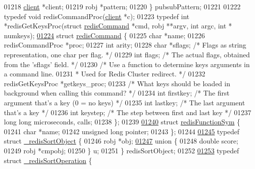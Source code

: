 \begin{DoxyCode}
{{{{{{{01218     \hyperlink{structclient}{client} *client;
01219     robj *pattern;
01220 \} pubsubPattern;
01221 
01222 \textcolor{keyword}{typedef} \textcolor{keywordtype}{void} redisCommandProc(\hyperlink{structclient}{client} *c);
01223 \textcolor{keyword}{typedef} \textcolor{keywordtype}{int} *redisGetKeysProc(\textcolor{keyword}{struct} \hyperlink{structredisCommand}{redisCommand} *cmd, robj **argv, \textcolor{keywordtype}{int} argc, \textcolor{keywordtype}{int} *
      numkeys);
\hyperlink{structredisCommand}{01224} \textcolor{keyword}{struct} \hyperlink{structredisCommand}{redisCommand} \{
01225     \textcolor{keywordtype}{char} *name;
01226     redisCommandProc *proc;
01227     \textcolor{keywordtype}{int} arity;
01228     \textcolor{keywordtype}{char} *sflags; \textcolor{comment}{/* Flags as string representation, one char per flag. */}
01229     \textcolor{keywordtype}{int} flags;    \textcolor{comment}{/* The actual flags, obtained from the 'sflags' field. */}
01230     \textcolor{comment}{/* Use a function to determine keys arguments in a command line.}
01231 \textcolor{comment}{     * Used for Redis Cluster redirect. */}
01232     redisGetKeysProc *getkeys\_proc;
01233     \textcolor{comment}{/* What keys should be loaded in background when calling this command? */}
01234     \textcolor{keywordtype}{int} firstkey; \textcolor{comment}{/* The first argument that's a key (0 = no keys) */}
01235     \textcolor{keywordtype}{int} lastkey;  \textcolor{comment}{/* The last argument that's a key */}
01236     \textcolor{keywordtype}{int} keystep;  \textcolor{comment}{/* The step between first and last key */}
01237     \textcolor{keywordtype}{long} \textcolor{keywordtype}{long} microseconds, calls;
01238 \};
01239 
\hyperlink{structredisFunctionSym}{01240} \textcolor{keyword}{struct} \hyperlink{structredisFunctionSym}{redisFunctionSym} \{
01241     \textcolor{keywordtype}{char} *name;
01242     \textcolor{keywordtype}{unsigned} \textcolor{keywordtype}{long} pointer;
01243 \};
01244 
\hyperlink{struct__redisSortObject}{01245} \textcolor{keyword}{typedef} \textcolor{keyword}{struct} \hyperlink{struct__redisSortObject}{\_redisSortObject} \{
01246     robj *obj;
\hyperlink{union__redisSortObject_8u}{01247}     \textcolor{keyword}{union} \{
01248         \textcolor{keywordtype}{double} score;
01249         robj *cmpobj;
01250     \} u;
01251 \} redisSortObject;
01252 
\hyperlink{struct__redisSortOperation}{01253} \textcolor{keyword}{typedef} \textcolor{keyword}{struct} \hyperlink{struct__redisSortOperation}{\_redisSortOperation} \{
}}}}}}}
\end{DoxyCode}
